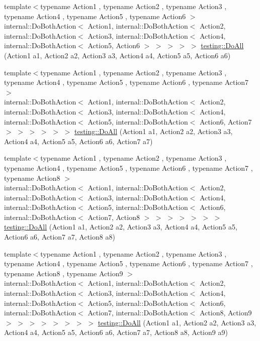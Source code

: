 \begin{DoxyCompactItemize}
\item 
{\footnotesize template$<$typename Action1 , typename Action2 , typename Action3 , typename Action4 , typename Action5 , typename Action6 $>$ }\\internal\+::\+Do\+Both\+Action$<$ Action1, internal\+::\+Do\+Both\+Action$<$ Action2, internal\+::\+Do\+Both\+Action$<$ Action3, internal\+::\+Do\+Both\+Action$<$ Action4, internal\+::\+Do\+Both\+Action$<$ Action5, Action6 $>$ $>$ $>$ $>$ $>$ \hyperlink{namespacetesting_aa6c87c8d7520fb333f1559487d3e06e9}{testing\+::\+Do\+All} (Action1 a1, Action2 a2, Action3 a3, Action4 a4, Action5 a5, Action6 a6)
\item 
{\footnotesize template$<$typename Action1 , typename Action2 , typename Action3 , typename Action4 , typename Action5 , typename Action6 , typename Action7 $>$ }\\internal\+::\+Do\+Both\+Action$<$ Action1, internal\+::\+Do\+Both\+Action$<$ Action2, internal\+::\+Do\+Both\+Action$<$ Action3, internal\+::\+Do\+Both\+Action$<$ Action4, internal\+::\+Do\+Both\+Action$<$ Action5, internal\+::\+Do\+Both\+Action$<$ Action6, Action7 $>$ $>$ $>$ $>$ $>$ $>$ \hyperlink{namespacetesting_aadfaf4eb9897dcabe067b1d882febc86}{testing\+::\+Do\+All} (Action1 a1, Action2 a2, Action3 a3, Action4 a4, Action5 a5, Action6 a6, Action7 a7)
\item 
{\footnotesize template$<$typename Action1 , typename Action2 , typename Action3 , typename Action4 , typename Action5 , typename Action6 , typename Action7 , typename Action8 $>$ }\\internal\+::\+Do\+Both\+Action$<$ Action1, internal\+::\+Do\+Both\+Action$<$ Action2, internal\+::\+Do\+Both\+Action$<$ Action3, internal\+::\+Do\+Both\+Action$<$ Action4, internal\+::\+Do\+Both\+Action$<$ Action5, internal\+::\+Do\+Both\+Action$<$ Action6, internal\+::\+Do\+Both\+Action$<$ Action7, Action8 $>$ $>$ $>$ $>$ $>$ $>$ $>$ \hyperlink{namespacetesting_a2c0e69056a8e5bc4ddc2308ba0af5214}{testing\+::\+Do\+All} (Action1 a1, Action2 a2, Action3 a3, Action4 a4, Action5 a5, Action6 a6, Action7 a7, Action8 a8)
\item 
{\footnotesize template$<$typename Action1 , typename Action2 , typename Action3 , typename Action4 , typename Action5 , typename Action6 , typename Action7 , typename Action8 , typename Action9 $>$ }\\internal\+::\+Do\+Both\+Action$<$ Action1, internal\+::\+Do\+Both\+Action$<$ Action2, internal\+::\+Do\+Both\+Action$<$ Action3, internal\+::\+Do\+Both\+Action$<$ Action4, internal\+::\+Do\+Both\+Action$<$ Action5, internal\+::\+Do\+Both\+Action$<$ Action6, internal\+::\+Do\+Both\+Action$<$ Action7, internal\+::\+Do\+Both\+Action$<$ Action8, Action9 $>$ $>$ $>$ $>$ $>$ $>$ $>$ $>$ \hyperlink{namespacetesting_a3479e234532d82d0a093f7ffdb3ac254}{testing\+::\+Do\+All} (Action1 a1, Action2 a2, Action3 a3, Action4 a4, Action5 a5, Action6 a6, Action7 a7, Action8 a8, Action9 a9)

\end{DoxyCompactItemize}
